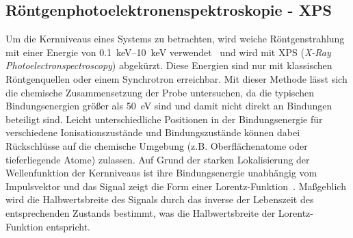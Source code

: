 
        \subsection{Röntgenphotoelektronenspektroskopie - XPS} \label{sec:XPS}
            Um die Kernniveaus eines Systems zu betrachten, wird weiche Röntgenstrahlung mit einer Energie von \SIrange{0.1}{10}{\kilo\electronvolt} verwendet~\cite{Fauster} und wird mit XPS (\textit{X-Ray Photoelectronspectroscopy}) abgekürzt.
            Diese Energien sind nur mit klassischen Röntgenquellen oder einem Synchrotron erreichbar.
            Mit dieser Methode lässt sich die chemische Zusammensetzung der Probe untersuchen, da die typischen Bindungsenergien größer als \SI{50}{\electronvolt} sind und damit nicht direkt an Bindungen beteiligt sind.
            Leicht unterschiedliche Positionen in der Bindungsenergie für verschiedene Ionisationszustände und Bindungszustände können dabei Rückschlüsse auf die chemische Umgebung (z.B. Oberflächenatome oder tieferliegende Atome) zulassen.
            Auf Grund der starken Lokalisierung der Wellenfunktion der Kernniveaus ist ihre Bindungsenergie unabhängig vom Impulsvektor und das Signal zeigt die Form einer Lorentz-Funktion~\cite{Hüfner}.
            Maßgeblich wird die Halbwertsbreite des Signals durch das inverse der Lebenszeit des entsprechenden Zustands bestimmt, was die Halbwertsbreite der Lorentz-Funktion entspricht.

